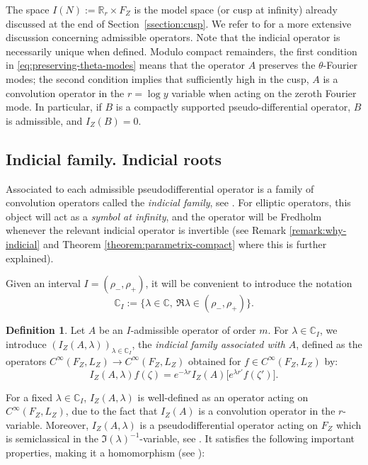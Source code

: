 \documentclass[JEP,XML,SOM,Unicode,NoFloatCountersInSection]{cedram}
\newcommand{\C}{\mathbb{C}}
\newcommand{\R}{\mathbb{R}}
\theoremstyle{plain}
\theoremstyle{definition}
\newtheorem{definition}{Definition}[section]
\begin{document}
The space $I(N) := \R_r \times F_Z$ is the model space (or cusp at infinity) already discussed at the end of Section~\ref{ssection:cusp}. We refer to \cite[\S 4]{Bonthonneau-Lefeuvre-19-1} for a more extensive discussion concerning admissible operators. Note that the indicial operator is necessarily unique when defined. Modulo compact remainders, the first condition in \eqref{eq:preserving-theta-modes} means that the operator $A$ preserves the $\theta$-Fourier modes; the second condition implies that sufficiently high in the cusp, $A$ is a convolution operator in the $r=\log y$ variable when acting on the zeroth Fourier mode. In particular, if $B$ is a compactly supported pseudo-differential operator, $B$ is admissible, and $I_Z(B)=0$.

\subsection{Indicial family. Indicial roots}
\label{section:indicialfamily-indicialroots}

{\color{black}Associated to each admissible pseudodifferential operator is a family of convolution operators called the \emph{indicial family}, see \cite[\S 4.2.1]{Bonthonneau-Lefeuvre-19-1}. For elliptic operators, this object will act as a \emph{symbol at infinity}, and the operator will be Fredholm whenever the relevant indicial operator is invertible (see Remark \ref{remark:why-indicial} and Theorem \ref{theorem:parametrix-compact} where this is further explained).}

Given an interval $I=(\rho_-, \rho_+)$, it will be convenient to introduce the notation
\[
\C_{I}:= \{\lambda\in \C,\ \Re\lambda \in (\rho_-, \rho_+) \}.
\]

\begin{definition}
\label{definition:indicial-family}
Let $A$ be an $I$-admissible operator of order $m$. For $\lambda \in \C_I$, we introduce $(I_Z(A,\lambda))_{\lambda \in \C_I}$, the \emph{indicial family associated with $A$}, defined as the operators $C^\infty(F_Z,L_Z) \to C^\infty(F_Z,L_Z)$ obtained for $f \in C^\infty(F_Z,L_Z)$ by:
\begin{equation}
\label{equation:indicial-family}
I_Z(A,\lambda)f(\zeta) = e^{-\lambda r} I_Z(A)\bigl[ e^{\lambda r'}f(\zeta')\bigr].
\end{equation}
\end{definition}

For a fixed $\lambda \in \C_I$, $I_Z(A,\lambda)$ is well-defined as an operator acting on $C^\infty(F_Z,L_Z)$, due to the fact that $I_Z(A)$ is a convolution operator in the $r$-variable. Moreover, $I_Z(A,\lambda)$ is a pseudodifferential operator acting on $F_Z$ which is semiclassical in the $\Im(\lambda)^{-1}$-variable, see \cite[Lem.\,4.7]{Bonthonneau-Lefeuvre-19-1}. It satisfies the following important properties, making it a homomorphism (see \cite[Lem.\,4.8]{Bonthonneau-Lefeuvre-19-1}):
\end{document}
